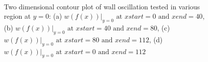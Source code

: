 \begin{figure}[!h]
\ContinuedFloat
\centering
   \\
   \caption{Two dimensional contour plot of wall oscillation tested in various region at $y=0$: (a) $w(f(x))|_{y=0} \mbox{ at } xstart = 0 \mbox{ and } xend = 40$, (b) $w(f(x))|_{y=0} \mbox{ at } xstart = 40 \mbox{ and } xend = 80$, (c) $w(f(x))|_{y=0} \mbox{ at } xstart = 80 \mbox{ and } xend = 112$, (d)  $w(f(x))|_{y=0} \mbox{ at } xstart = 0 \mbox{ and } xend = 112$}
 \end{figure}

